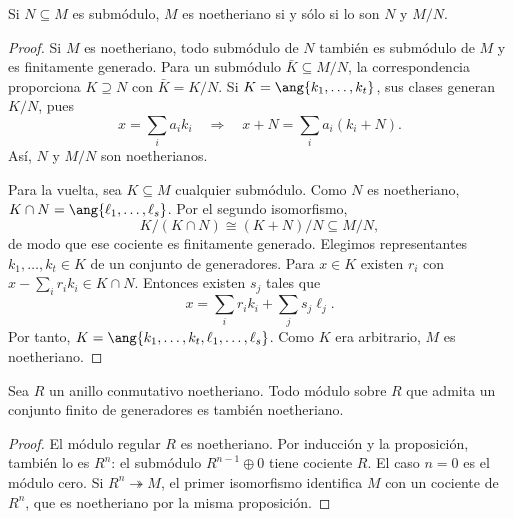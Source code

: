 \begin{prop}\label{prop:C15-extension}
Si $N\subseteq M$ es submódulo, $M$ es noetheriano si y sólo si lo son $N$ y $M/N$.
\end{prop}
\begin{proof}
Si $M$ es noetheriano, todo submódulo de $N$ también es submódulo de $M$ y es finitamente generado. Para un submódulo $\bar K\subseteq M/N$, la correspondencia proporciona $K\supseteq N$ con $\bar K=K/N$. Si $K=\ang{k_1,\ldots,k_t}$, sus clases generan $K/N$, pues
\[
x=\sum_i a_ik_i\quad\Longrightarrow\quad
x+N=\sum_i a_i(k_i+N).
\]
Así, $N$ y $M/N$ son noetherianos.

Para la vuelta, sea $K\subseteq M$ cualquier submódulo. Como $N$ es noetheriano, $K\cap N=\ang{\ell_1,\ldots,\ell_s}$. Por el segundo isomorfismo,
\[
K/(K\cap N)\cong(K+N)/N\subseteq M/N,
\]
de modo que ese cociente es finitamente generado. Elegimos representantes $k_1,\ldots,k_t\in K$ de un conjunto de generadores. Para $x\in K$ existen $r_i$ con $x-\sum_i r_ik_i\in K\cap N$. Entonces existen $s_j$ tales que
\[
x=\sum_i r_ik_i+\sum_j s_j\ell_j.
\]
Por tanto, $K=\ang{k_1,\ldots,k_t,\ell_1,\ldots,\ell_s}$. Como $K$ era arbitrario, $M$ es noetheriano.
\end{proof}

\begin{coro}\label{coro:C15-finito-noetheriano}
Sea $R$ un anillo conmutativo noetheriano. Todo módulo sobre $R$ que admita un conjunto finito de generadores es también noetheriano.
\end{coro}
\begin{proof}
El módulo regular $R$ es noetheriano. Por inducción y la proposición, también lo es $R^n$: el submódulo $R^{n-1}\oplus0$ tiene cociente $R$. El caso $n=0$ es el módulo cero. Si $R^n\twoheadrightarrow M$, el primer isomorfismo identifica $M$ con un cociente de $R^n$, que es noetheriano por la misma proposición.
\end{proof}

